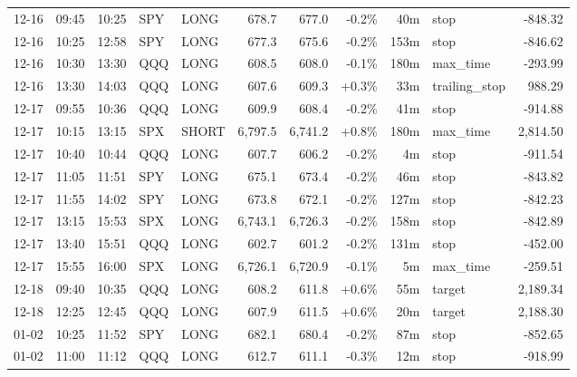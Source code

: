 \documentclass[11pt,a4paper,twoside]{article}
\begin{document}
\begin{center}
\begin{longtable}{>{\color{txtmain}}l l l l l r r r r >{\color{txtmain}}l r}
12-16 & 09:45 & 10:25 & SPY & LONG & 678.7 & 677.0 & \textcolor{lossred}{-0.2\%} & 40m & stop & \textcolor{lossred}{-848.32} \\
12-16 & 10:25 & 12:58 & SPY & LONG & 677.3 & 675.6 & \textcolor{lossred}{-0.2\%} & 153m & stop & \textcolor{lossred}{-846.62} \\
12-16 & 10:30 & 13:30 & QQQ & LONG & 608.5 & 608.0 & \textcolor{lossred}{-0.1\%} & 180m & max\_time & \textcolor{lossred}{-293.99} \\
12-16 & 13:30 & 14:03 & QQQ & LONG & 607.6 & 609.3 & \textcolor{wingreen}{+0.3\%} & 33m & trailing\_stop & \textcolor{wingreen}{988.29} \\
12-17 & 09:55 & 10:36 & QQQ & LONG & 609.9 & 608.4 & \textcolor{lossred}{-0.2\%} & 41m & stop & \textcolor{lossred}{-914.88} \\
12-17 & 10:15 & 13:15 & SPX & SHORT & 6,797.5 & 6,741.2 & \textcolor{wingreen}{+0.8\%} & 180m & max\_time & \textcolor{wingreen}{2,814.50} \\
12-17 & 10:40 & 10:44 & QQQ & LONG & 607.7 & 606.2 & \textcolor{lossred}{-0.2\%} & 4m & stop & \textcolor{lossred}{-911.54} \\
12-17 & 11:05 & 11:51 & SPY & LONG & 675.1 & 673.4 & \textcolor{lossred}{-0.2\%} & 46m & stop & \textcolor{lossred}{-843.82} \\
12-17 & 11:55 & 14:02 & SPY & LONG & 673.8 & 672.1 & \textcolor{lossred}{-0.2\%} & 127m & stop & \textcolor{lossred}{-842.23} \\
12-17 & 13:15 & 15:53 & SPX & LONG & 6,743.1 & 6,726.3 & \textcolor{lossred}{-0.2\%} & 158m & stop & \textcolor{lossred}{-842.89} \\
12-17 & 13:40 & 15:51 & QQQ & LONG & 602.7 & 601.2 & \textcolor{lossred}{-0.2\%} & 131m & stop & \textcolor{lossred}{-452.00} \\
12-17 & 15:55 & 16:00 & SPX & LONG & 6,726.1 & 6,720.9 & \textcolor{lossred}{-0.1\%} & 5m & max\_time & \textcolor{lossred}{-259.51} \\
12-18 & 09:40 & 10:35 & QQQ & LONG & 608.2 & 611.8 & \textcolor{wingreen}{+0.6\%} & 55m & target & \textcolor{wingreen}{2,189.34} \\
12-18 & 12:25 & 12:45 & QQQ & LONG & 607.9 & 611.5 & \textcolor{wingreen}{+0.6\%} & 20m & target & \textcolor{wingreen}{2,188.30} \\
01-02 & 10:25 & 11:52 & SPY & LONG & 682.1 & 680.4 & \textcolor{lossred}{-0.2\%} & 87m & stop & \textcolor{lossred}{-852.65} \\
01-02 & 11:00 & 11:12 & QQQ & LONG & 612.7 & 611.1 & \textcolor{lossred}{-0.3\%} & 12m & stop & \textcolor{lossred}{-918.99} \\

\end{longtable}
\end{center}
\end{document}
